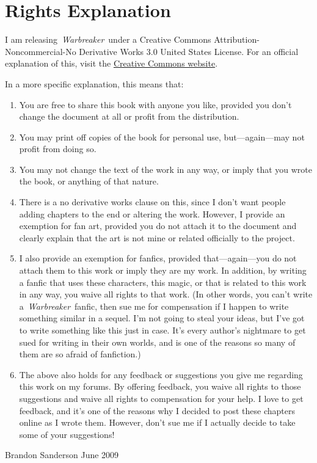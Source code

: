 \chapter{Rights Explanation}

I am releasing~\textit{Warbreaker}~under a Creative Commons Attribution-Noncommercial-No Derivative Works 3.0 United States License. For an official explanation of this, visit the \href{https://creativecommons.org/licenses/by-nc-nd/3.0/us/}{Creative Commons website}.

In a more specific explanation, this means that:

\begin{enumerate}
    \item You are free to share this book with anyone you like, provided you don’t change the document at all or profit from the distribution.

    \item You may print off copies of the book for personal use, but—again—may not profit from doing so.

    \item You may not change the text of the work in any way, or imply that you wrote the book, or anything of that nature.

    \item There is a no derivative works clause on this, since I don’t want people adding chapters to the end or altering the work. However, I provide an exemption for fan art, provided you do not attach it to the document and clearly explain that the art is not mine or related officially to the project.

    \item I also provide an exemption for fanfics, provided that—again—you do not attach them to this work or imply they are my work. In addition, by writing a fanfic that uses these characters, this magic, or that is related to this work in any way, you waive all rights to that work. (In other words, you can’t write a~\textit{Warbreaker}~fanfic, then sue me for compensation if I happen to write something similar in a sequel. I’m not going to steal your ideas, but I’ve got to write something like this just in case. It’s every author’s nightmare to get sued for writing in their own worlds, and is one of the reasons so many of them are so afraid of fanfiction.)

    \item The above also holds for any feedback or suggestions you give me regarding this work on my forums. By offering feedback, you waive all rights to those suggestions and waive all rights to compensation for your help. I love to get feedback, and it’s one of the reasons why I decided to post these chapters online as I wrote them. However, don’t sue me if I actually decide to take some of your suggestions!

\end{enumerate}

\hfill Brandon Sanderson June 2009

